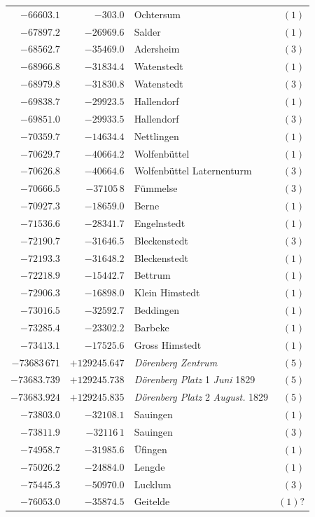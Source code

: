 \begin{center}
\begin{tabular}{r|r|p{170pt}|r}
\(-66603.1\)&\(-303.0\)&Ochtersum&\((1)\)\\
\(-67897.2\)&\(-26969.6\)&Salder&\((1)\)\\
\(-68562.7\)&\(-35469.0\)&Adersheim&\((3)\)\\
\(-68966.8\)&\(-31834.4\)&Watenstedt&\((1)\)\\
\(-68979.8\)&\(-31830.8\)&Watenstedt&\((3)\)\\
\(-69838.7\)&\(-29923.5\)&Hallendorf&\((1)\)\\
\(-69851.0\)&\(-29933.5\)&Hallendorf&\((3)\)\\
\(-70359.7\)&\(-14634.4\)&Nettlingen&\((1)\)\\
\(-70629.7\)&\(-40664.2\)&Wolfenbüttel&\((1)\)\\
\(-70626.8\)&\(-40664.6\)&Wolfenbüttel Laternenturm&\((3)\)\\
\(-70666.5\)&\(-37105\,8\)&Fümmelse&\((3)\)\\
\(-70927.3\)&\(-18659.0\)&Berne&\((1)\)\\
\(-71536.6\)&\(-28341.7\)&Engelnstedt&\((1)\)\\
\(-72190.7\)&\(-31646.5\)&Bleckenstedt&\((3)\)\\
\(-72193.3\)&\(-31648.2\)&Bleckenstedt&\((1)\)\\
\(-72218.9\)&\(-15442.7\)&Bettrum&\((1)\)\\
\(-72906.3\)&\(-16898.0\)&Klein Himstedt&\((1)\)\\
\(-73016.5\)&\(-32592.7\)&Beddingen&\((1)\)\\
\(-73285.4\)&\(-23302.2\)&Barbeke&\((1)\)\\
\(-73413.1\)&\(-17525.6\)&Gross Himstedt&\((1)\)\\
\(-73683\,671\)&\(+129245.647\)&\textit{Dörenberg Zentrum}&\((5)\)\\
\(-73683.739\)&\(+129245.738\)&\textit{Dörenberg Platz} 1 \textit{Juni} 1829&\((5)\)\\
\(-73683.924\)&\(+129245.835\)&\textit{Dörenberg Platz} 2 \textit{August.} 1829&\((5)\)\\
\(-73803.0\)&\(-32108.1\)&Sauingen&\((1)\)\\
\(-73811.9\)&\(-32116\,1\)&Sauingen&\((3)\)\\
\(-74958.7\)&\(-31985.6\)&Üfingen&\((1)\)\\
\(-75026.2\)&\(-24884.0\)&Lengde&\((1)\)\\
\(-75445.3\)&\(-50970.0\)&Lucklum&\((3)\)\\
\(-76053.0\)&\(-35874.5\)&Geitelde&\((1)?\)\\
\hline\end{tabular}\endgroup\end{center}
